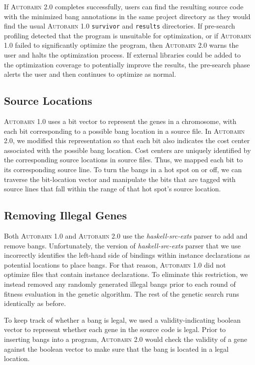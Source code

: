 \documentclass[format=sigplan, review=true]{acmart}
\newcommand{\hotspot}[0]{hot spot}
\newcommand{\Ao}[0]{\textsc{Autobahn 1.0}}
\newcommand{\At}[0]{\textsc{Autobahn 2.0}}
\newcommand{\preopt}[0]{pre-search}
\begin{document}
If \At{} completes successfully, users can find the resulting source
code with the minimized bang annotations in the same project
directory as they would find the usual \Ao{} \texttt{survivor}
and \texttt{results} directories. If \preopt{} profiling detected that
the program is unsuitable for optimization, or if \Ao{} failed to
significantly optimize the program, then \At{} warns the user and
halts the optimization process. If external libraries could be added to
the optimization coverage to potentially improve the results,
the \preopt{} phase alerts the user and then continues to optimize as
normal.

\subsection{Source Locations}
\Ao{} uses a bit vector to represent the genes in a
chromosome, with each bit corresponding to a possible bang location in
a source file.  In \At{}, we modified this representation so that each
bit also indicates the cost center associated with the possible bang
location.   Cost centers are uniquely identified by the corresponding source
locations in source files.  Thus, we mapped each bit to its corresponding
source line. To turn the bangs in a \hotspot{} on or off, we can
traverse the bit-location vector and manipulate the bits that are
tagged with source lines that fall within the range of
that \hotspot{}'s source location.

\subsection{Removing Illegal Genes}
Both \Ao{} and \At{} use the \textit{haskell-src-exts} parser to add
and remove bangs.  
Unfortunately, the version of \textit{haskell-src-exts} parser that we use
incorrectly identifies the left-hand side of bindings within instance
declarations as potential locations to place bangs. For that reason,
\Ao{} did not optimize files that contain instance declarations. 
To eliminate this restriction, we instead removed any randomly
generated illegal bangs prior to each round of fitness evaluation in
the genetic algorithm. The rest of the genetic search runs
identically as before.

To keep track of whether a bang is legal, we used a
validity-indicating boolean vector to represent whether each gene in
the source code is legal. Prior to inserting bangs into a
program, \At{} would check the validity of a gene against the boolean
vector to make sure that the bang is located in a legal location.
\end{document}
